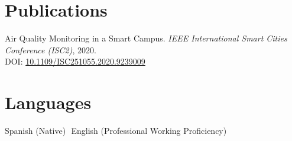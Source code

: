 \documentclass[11pt,a4paper]{article}
\newcommand{\sep}{\,\textbar\,}
\begin{document}
\section*{Publications}
Air Quality Monitoring in a Smart Campus. \emph{IEEE International Smart Cities Conference (ISC2)}, 2020.\\
DOI: \href{https://doi.org/10.1109/ISC251055.2020.9239009}{10.1109/ISC251055.2020.9239009}

\section*{Languages}
Spanish (Native) \sep English (Professional Working Proficiency)
\end{document}
